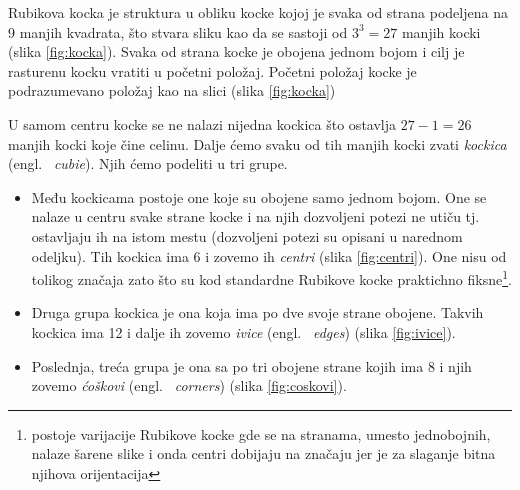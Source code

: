 \documentclass[a4paper]{article}
\begin{document}
Rubikova kocka je struktura u obliku kocke kojoj je svaka od strana podeljena na 9 manjih kvadrata, što stvara sliku kao da se sastoji od $3^3 = 27$ manjih kocki (slika \ref{fig:kocka}).
Svaka od strana kocke je obojena jednom bojom i cilj je rasturenu kocku vratiti u početni položaj. Početni položaj kocke je podrazumevano položaj kao na slici (slika \ref{fig:kocka})

U samom centru kocke se ne nalazi nijedna kockica što ostavlja $27 - 1 = 26$ manjih kocki koje čine celinu. Dalje ćemo svaku od tih manjih kocki zvati \textit{kockica} (engl. ~{\em cubie}).
Njih ćemo podeliti u tri grupe.    
    
    \begin{figure}[h]
        \centering
        \caption{}
        \label{fig:kockice}
    \end{figure}
    
\begin{itemize}
\item Među kockicama postoje one koje su obojene samo jednom bojom.
    One se nalaze u centru svake strane kocke i na njih dozvoljeni potezi ne utiču tj. ostavljaju ih na istom mestu (dozvoljeni potezi su opisani u narednom odeljku).
    Tih kockica ima 6 i zovemo ih \textit{centri} (slika \ref{fig:centri}). One nisu od tolikog značaja zato što su kod standardne Rubikove kocke praktichno fiksne\footnote{postoje varijacije Rubikove kocke gde se na stranama, umesto jednobojnih, nalaze šarene slike i onda centri dobijaju na značaju jer je za slaganje bitna njihova orijentacija}.
\item Druga grupa kockica je ona koja ima po dve svoje strane obojene.
    Takvih kockica ima 12 i dalje ih zovemo \textit{ivice} (engl. ~{\em edges}) (slika \ref{fig:ivice}).
\item Poslednja, treća grupa je ona sa po tri obojene strane kojih ima 8 i njih zovemo \textit{ćoškovi} (engl. ~{\em corners}) (slika \ref{fig:coskovi}).
\end{itemize} 
\end{document}
